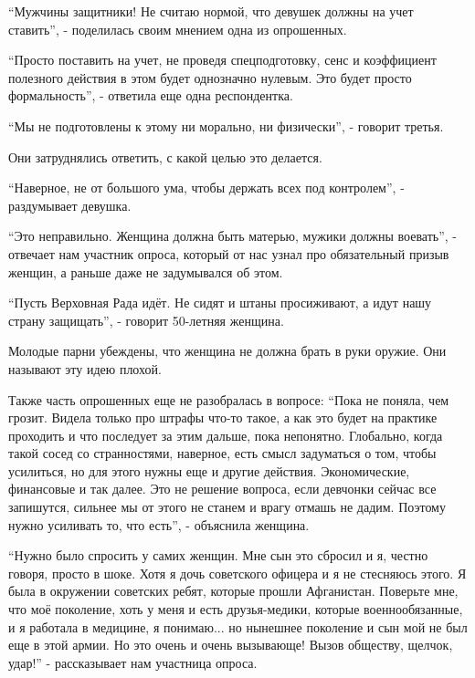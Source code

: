 \begin{multicols}{2}
\enquote{Мужчины защитники! Не считаю нормой, что девушек должны на учет ставить}, -
поделилась своим мнением одна из опрошенных.

\enquote{Просто поставить на учет, не проведя спецподготовку, сенс и коэффициент
полезного действия в этом будет однозначно нулевым. Это будет просто
формальность}, - ответила еще одна респондентка.

\enquote{Мы не подготовлены к этому ни морально, ни физически}, - говорит третья.

Они затруднялись ответить, с какой целью это делается. 

\enquote{Наверное, не от большого ума, чтобы держать всех под контролем}, - раздумывает
девушка. 


\enquote{Это неправильно. Женщина должна быть матерью, мужики должны воевать}, -
отвечает нам участник опроса, который от нас узнал про обязательный призыв
женщин, а раньше даже не задумывался об этом. 


\enquote{Пусть Верховная Рада идёт. Не сидят и штаны просиживают, а идут нашу страну
защищать}, - говорит 50-летняя женщина. 


Молодые парни убеждены, что женщина не должна брать в руки оружие. Они называют
эту идею плохой. 

Также часть опрошенных еще не разобралась в вопросе: \enquote{Пока не поняла, чем
грозит. Видела только про штрафы что-то такое, а как это будет на практике
проходить и что последует за этим дальше, пока непонятно. Глобально, когда
такой сосед со странностями, наверное, есть смысл задуматься о том, чтобы
усилиться, но для этого нужны еще и другие действия. Экономические, финансовые
и так далее. Это не решение вопроса, если девчонки сейчас все запишутся,
сильнее мы от этого не станем и врагу отмашь не дадим. Поэтому нужно усиливать
то, что есть}, - объяснила женщина. 


\enquote{Нужно было спросить у самих женщин. Мне сын это сбросил и я, честно говоря,
просто в шоке. Хотя я дочь советского офицера и я не стесняюсь этого. Я была в
окружении советских ребят, которые прошли Афганистан. Поверьте мне, что моё
поколение, хоть у меня и есть друзья-медики, которые военнообязанные, и я
работала в медицине, я понимаю... но нынешнее поколение и сын мой не был еще в
этой армии. Но это очень и очень вызывающе! Вызов обществу, щелчок, удар!} -
рассказывает нам участница опроса.


\end{multicols}
